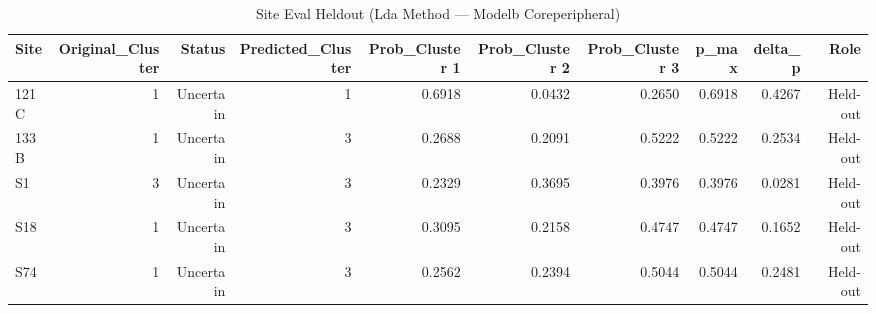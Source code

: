 \begin{table}[htbp]
  \centering
  \caption{Site Eval Heldout (Lda Method — Modelb Coreperipheral)}
  \label{tab:LDA_Method_ModelB_CorePeripheral_tables_site_eval_heldout}
  \small
  \begin{tabular}{lrrrrrrrrr}
    \toprule
    Site & Original\_Cluster & Status & Predicted\_Cluster & Prob\_Cluster 1 & Prob\_Cluster 2 & Prob\_Cluster 3 & p\_max & delta\_p & Role \\
    \midrule
    121C & 1 & Uncertain & 1 & 0.6918 & 0.0432 & 0.2650 & 0.6918 & 0.4267 & Held-out \\
    133B & 1 & Uncertain & 3 & 0.2688 & 0.2091 & 0.5222 & 0.5222 & 0.2534 & Held-out \\
    S1 & 3 & Uncertain & 3 & 0.2329 & 0.3695 & 0.3976 & 0.3976 & 0.0281 & Held-out \\
    S18 & 1 & Uncertain & 3 & 0.3095 & 0.2158 & 0.4747 & 0.4747 & 0.1652 & Held-out \\
    S74 & 1 & Uncertain & 3 & 0.2562 & 0.2394 & 0.5044 & 0.5044 & 0.2481 & Held-out \\
    \bottomrule
  \end{tabular}
\end{table}
